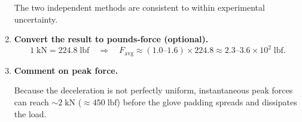 \documentclass[12pt]{article}
\theoremstyle{definition} %
\theoremstyle{plain} %
\begin{document}
\begin{enumerate}[label=\textbf{Step \arabic*:}, leftmargin=2.2em]
        The two independent methods are consistent to within
        experimental uncertainty.

  \item \textbf{Convert the result to pounds‑force (optional).}
        \[
          1\;\text{kN} = 224.8\;\text{lbf}
          \quad\Longrightarrow\quad
          F_{\text{avg}}\approx
          (1.0\text{–}1.6)\times 224.8
          \approx 2.3\text{–}3.6\times 10^{2}\;\text{lbf}.
        \]

  \item \textbf{Comment on peak force.}

        Because the deceleration is not perfectly uniform,
        instantaneous peak forces can reach $\sim2\;\text{kN}$
        ($\approx450\;\text{lbf}$) before the glove padding
        spreads and dissipates the load.

\end{enumerate}
\end{document}

